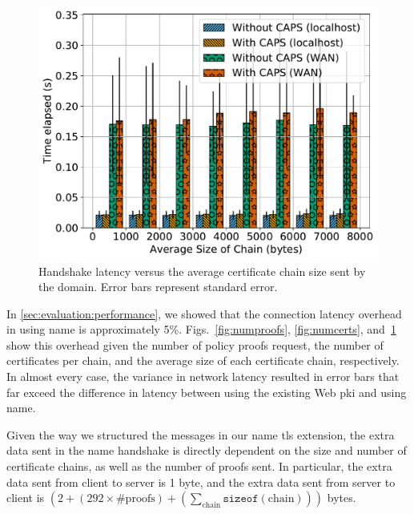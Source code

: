 \begin{figure}[t]
  \centering
  \includegraphics[width=0.8\linewidth]{fig/eval_tls_ext/3-time_elapsed_vs_avg_chain_size}
  \caption{Handshake latency versus the average certificate chain size sent by the
  domain. Error bars represent standard error.}
  \label{fig:chainsize}
\end{figure}

In \autoref{sec:evaluation:performance}, we showed that the connection latency
overhead in using \ac{name} is approximately 5\%. Figs.~\ref{fig:numproofs},
\ref{fig:numcerts}, and~\ref{fig:chainsize} show this overhead given the number
of policy proofs request, the number of certificates per chain, and the average
size of each certificate chain, respectively. In almost every case, the variance
in network latency resulted in error bars that far exceed the difference in
latency between using the existing Web \ac{pki} and using \ac{name}.

Given the way we structured the messages in our \ac{name} \ac{tls} extension,
the extra data sent in the \ac{name} handshake is directly dependent on the size
and number of certificate chains, as well as the number of proofs sent. In
particular, the extra data sent from client to server is 1 byte, and the extra
data sent from server to client is $(2 + (292 \times \text{\#proofs}) +
(\sum_{\text{chain}}\texttt{sizeof}(\text{chain})))$ bytes. 
